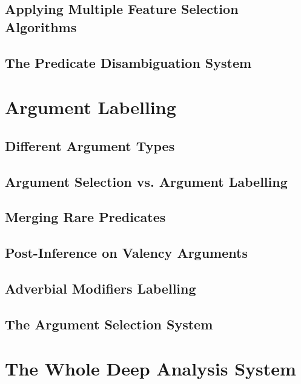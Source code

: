 \documentclass[12pt,notitlepage]{report}
\begin{document}
\section{Applying Multiple Feature Selection Algorithms}
\section{The Predicate Disambiguation System}

\chapter{Argument Labelling}\label{ac}
\section{Different Argument Types}
\section{Argument Selection vs. Argument Labelling}
\section{Merging Rare Predicates}
\section{Post-Inference on Valency Arguments}\label{post-inference}
\section{Adverbial Modifiers Labelling}
\section{The Argument Selection System}

\chapter{The Whole Deep Analysis System}\label{setup}
\end{document}
